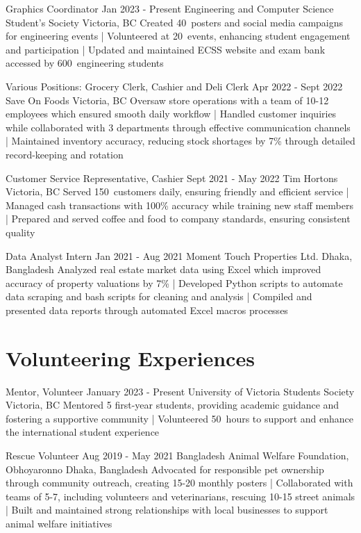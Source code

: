 \documentclass[a4paper,10pt]{article}
\begin{document}
\relevantexperience
{Graphics Coordinator}
{Jan 2023 - Present}
{Engineering and Computer Science Student’s Society}
{Victoria, BC}
{Created 40\plus\ posters and social media campaigns for engineering events 
| Volunteered at 20\plus\ events, enhancing student engagement and participation 
| Updated and maintained ECSS website and exam bank accessed by 600\plus\ engineering students
}

\relevantexperience
{Various Positions: Grocery Clerk, Cashier and Deli Clerk}
{Apr 2022 - Sept 2022}
{Save On Foods}
{Victoria, BC}
{Oversaw store operations with a team of 10-12 employees which ensured smooth daily workflow 
| Handled customer inquiries while collaborated with 3 departments through effective communication channels 
| Maintained inventory accuracy, reducing stock shortages by 7\% through detailed record-keeping and rotation
}

\relevantexperience
{Customer Service Representative, Cashier}
{Sept 2021 - May 2022}
{Tim Hortons}
{Victoria, BC}
{Served 150\plus\ customers daily, ensuring friendly and efficient service 
| Managed cash transactions with 100\% accuracy while training new staff members 
| Prepared and served coffee and food to company standards, ensuring consistent quality
}

\relevantexperience
{Data Analyst Intern}
{Jan 2021 - Aug 2021}
{Moment Touch Properties Ltd.}
{Dhaka, Bangladesh}
{Analyzed real estate market data using Excel which improved accuracy of property valuations by 7\% 
| Developed Python scripts to automate data scraping and bash scripts for cleaning and analysis
| Compiled and presented data reports through automated Excel macros processes
}

\section{Volunteering Experiences}

\relevantexperience
{Mentor, Volunteer}
{January 2023 - Present}
{University of Victoria Students Society}
{Victoria, BC}
{Mentored 5 first-year students, providing academic guidance and fostering a supportive community
| Volunteered 50\plus\ hours to support and enhance the international student experience 
}

\relevantexperience
{Rescue Volunteer}
{Aug 2019 - May 2021}
{Bangladesh Animal Welfare Foundation, Obhoyaronno}
{Dhaka, Bangladesh}
{Advocated for responsible pet ownership through community outreach, creating 15-20 monthly posters 
| Collaborated with teams of 5-7, including volunteers and veterinarians, rescuing 10-15 street animals 
| Built and maintained strong relationships with local businesses to support animal welfare initiatives
}
\end{document}
